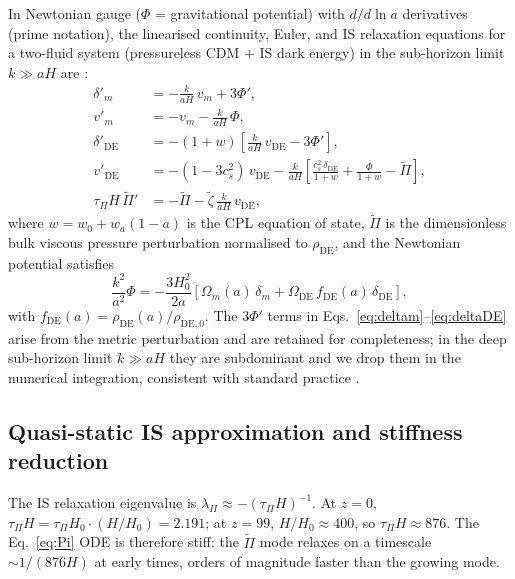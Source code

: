 \documentclass[12pt,a4paper]{article}
\newcommand{\wz}{w_0}
\newcommand{\wa}{w_a}
\newcommand{\OmDE}{\Omega_{\mathrm{DE}}}
\newcommand{\tauPi}{\tau_\Pi}
\newcommand{\ztilde}{\tilde{\zeta}}
\newcommand{\Pitilde}{\tilde{\Pi}}
\begin{document}
In Newtonian gauge ($\Phi$ = gravitational potential) with $d/d\ln a$ derivatives
(prime notation), the linearised continuity, Euler, and IS relaxation equations
for a two-fluid system (pressureless CDM + IS dark energy) in the sub-horizon
limit $k \gg aH$ are \citep{Hu1998,Maartens1996}:
\begin{align}
  \delta'_m &= -\frac{k}{aH}\,v_m + 3\Phi',
  \label{eq:deltam} \\
  v'_m      &= -v_m - \frac{k}{aH}\,\Phi,
  \label{eq:vm} \\
  \delta'_{\mathrm{DE}} &= -(1+w)\!\left[\frac{k}{aH}\,v_{\mathrm{DE}} - 3\Phi'\right],
  \label{eq:deltaDE} \\
  v'_{\mathrm{DE}} &= -(1-3c^2_s)\,v_{\mathrm{DE}}
    - \frac{k}{aH}\!\left[\frac{c^2_s\,\delta_{\mathrm{DE}}}{1+w}
    + \frac{\Phi}{1+w} - \Pitilde\right],
  \label{eq:vDE} \\
  \tauPi H\,\Pitilde' &= -\Pitilde - \ztilde\,\frac{k}{aH}\,v_{\mathrm{DE}},
  \label{eq:Pi}
\end{align}
where $w = \wz + \wa(1-a)$ is the CPL equation of state,
$\Pitilde$ is the dimensionless bulk viscous pressure perturbation normalised
to $\rho_{\mathrm{DE}}$, and the Newtonian potential satisfies
\begin{equation}
  \frac{k^2}{a^2}\Phi = -\frac{3H_0^2}{2a}\!\left[\Omega_m(a)\,\delta_m
    + \OmDE\,f_{\mathrm{DE}}(a)\,\delta_{\mathrm{DE}}\right],
  \label{eq:Poisson}
\end{equation}
with $f_{\mathrm{DE}}(a) = \rho_{\mathrm{DE}}(a)/\rho_{\mathrm{DE},0}$.
The $3\Phi'$ terms in Eqs.~\eqref{eq:deltam}--\eqref{eq:deltaDE} arise from the
metric perturbation and are retained for completeness; in the deep sub-horizon
limit $k \gg aH$ they are subdominant and we drop them in the numerical integration,
consistent with standard practice \citep{Hu1998}.

\subsection{Quasi-static IS approximation and stiffness reduction}
\label{subsec:QS}

The IS relaxation eigenvalue is $\lambda_\Pi \approx -(\tauPi H)^{-1}$.
At $z=0$, $\tauPi H = \tauPi H_0 \cdot (H/H_0) = 2.191$;
at $z=99$, $H/H_0 \approx 400$, so $\tauPi H \approx 876$.
The Eq.~\eqref{eq:Pi} ODE is therefore stiff: the $\Pitilde$ mode relaxes
on a timescale $\sim 1/(876 H)$ at early times, orders of magnitude faster
than the growing mode.
\end{document}
